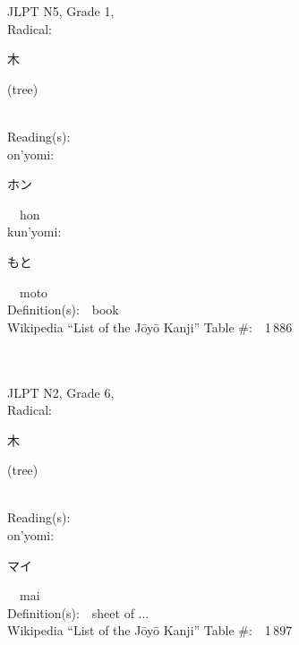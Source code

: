 \begin{multicols}{2}
{JLPT N5, Grade 1, \\Radical:\ \ {\begin{CJK}{UTF8}{min} 木 \end{CJK}} (tree) } \\
Reading(s):\ \ \\
{\hspace*{1em}}on'yomi:\ \ \\
{\hspace*{2em}}{\begin{CJK}{UTF8}{min} ホン \end{CJK}}\ \ hon\ \ \\
{\hspace*{1em}}kun'yomi:\ \ \\
{\hspace*{2em}}{\begin{CJK}{UTF8}{min} もと \end{CJK}}\ \ moto\ \ \\
Definition(s):\ \ book \\
Wikipedia ``List of the J\=oy\=o Kanji'' Table \#:\ \ 1\,886 \\
\ \ \\
{\fontsize{34pt}{40pt}  }\ \ \\  %
{JLPT N2, Grade 6, \\Radical:\ \ {\begin{CJK}{UTF8}{min} 木 \end{CJK}} (tree) } \\
Reading(s):\ \ \\
{\hspace*{1em}}on'yomi:\ \ \\
{\hspace*{2em}}{\begin{CJK}{UTF8}{min} マイ \end{CJK}}\ \ mai\ \ \\
Definition(s):\ \ sheet of ... \\
Wikipedia ``List of the J\=oy\=o Kanji'' Table \#:\ \ 1\,897 \\
\ \ \\
{\fontsize{34pt}{40pt}  }\ \ \\  %

\end{multicols}
